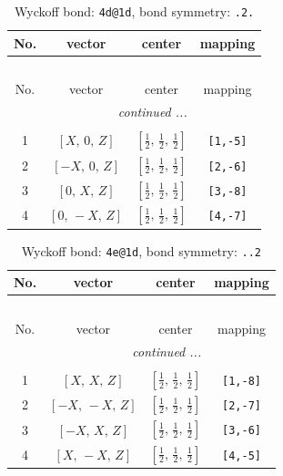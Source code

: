 \documentclass[fleqn,8pt]{jsarticle}
\begin{document}
\begin{longtable}{cccc}
\caption{Wyckoff bond: {\tt 4d@1d}, bond symmetry: {\tt .2.}}
 \\
 \hline \hline
No. & vector & center & mapping \\ \hline \endfirsthead

\multicolumn{3}{l}{\tablename\ \thetable{}} \\
 \hline \hline
No. & vector & center & mapping \\ \hline \endhead

 \hline \hline
\multicolumn{3}{r}{\footnotesize\it continued ...} \\ \endfoot

 \hline \hline
\multicolumn{3}{r}{} \\ \endlastfoot

1 & $\left[ X,\, 0,\, Z \right]$ & $\left[ \frac{1}{2},\, \frac{1}{2},\, \frac{1}{2} \right]$ & {\tt [1,-5]} \\ \hline
2 & $\left[ - X,\, 0,\, Z \right]$ & $\left[ \frac{1}{2},\, \frac{1}{2},\, \frac{1}{2} \right]$ & {\tt [2,-6]} \\ \hline
3 & $\left[ 0,\, X,\, Z \right]$ & $\left[ \frac{1}{2},\, \frac{1}{2},\, \frac{1}{2} \right]$ & {\tt [3,-8]} \\ \hline
4 & $\left[ 0,\, - X,\, Z \right]$ & $\left[ \frac{1}{2},\, \frac{1}{2},\, \frac{1}{2} \right]$ & {\tt [4,-7]} \\
\end{longtable}
\renewcommand{\arraystretch}{1.2}
\begin{longtable}{cccc}
\caption{Wyckoff bond: {\tt 4e@1d}, bond symmetry: {\tt ..2}}
 \\
 \hline \hline
No. & vector & center & mapping \\ \hline \endfirsthead

\multicolumn{3}{l}{\tablename\ \thetable{}} \\
 \hline \hline
No. & vector & center & mapping \\ \hline \endhead

 \hline \hline
\multicolumn{3}{r}{\footnotesize\it continued ...} \\ \endfoot

 \hline \hline
\multicolumn{3}{r}{} \\ \endlastfoot

1 & $\left[ X,\, X,\, Z \right]$ & $\left[ \frac{1}{2},\, \frac{1}{2},\, \frac{1}{2} \right]$ & {\tt [1,-8]} \\ \hline
2 & $\left[ - X,\, - X,\, Z \right]$ & $\left[ \frac{1}{2},\, \frac{1}{2},\, \frac{1}{2} \right]$ & {\tt [2,-7]} \\ \hline
3 & $\left[ - X,\, X,\, Z \right]$ & $\left[ \frac{1}{2},\, \frac{1}{2},\, \frac{1}{2} \right]$ & {\tt [3,-6]} \\ \hline
4 & $\left[ X,\, - X,\, Z \right]$ & $\left[ \frac{1}{2},\, \frac{1}{2},\, \frac{1}{2} \right]$ & {\tt [4,-5]} \\
\end{longtable}
\end{document}
